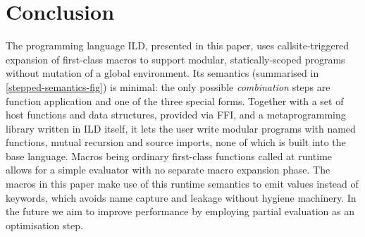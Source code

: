 \section{Conclusion}
The programming language ILD, presented in this paper, uses callsite-triggered
expansion of first-class macros to support modular, statically-scoped programs
without mutation of a global environment. Its semantics (summarised in
\cref{stepped-semantics-fig}) is minimal: the only possible \emph{combination}
steps are function application and one of the three special forms. Together
with a set of host functions and data structures, provided via FFI, and a
metaprogramming library written in ILD itself, it lets the user write modular
programs with named functions, mutual recursion and source imports, none of
which is built into the base language. Macros being ordinary first-class
functions called at runtime allows for a simple evaluator with no separate
macro expansion phase. The macros in this paper make use of this runtime
semantics to emit values instead of keywords, which avoids name capture and
leakage without hygiene machinery. In the future we aim to improve performance
by employing partial evaluation as an optimisation step.
